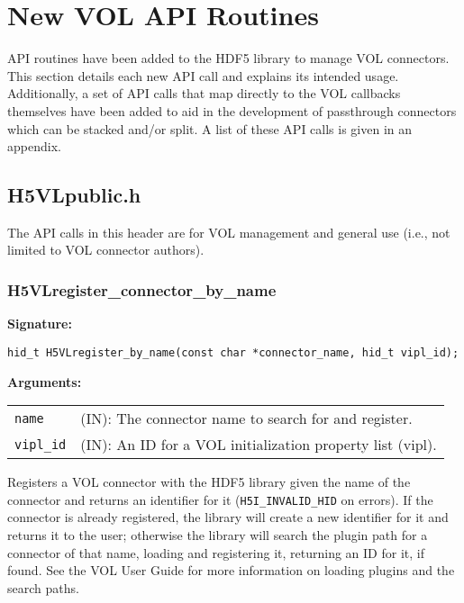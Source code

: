 \section{New VOL API Routines}
\label{sec:api}
API routines have been added to the HDF5 library to manage VOL connectors. This section details each new API call and explains its intended usage. Additionally, a set of API calls that map directly to the VOL callbacks themselves have been added to aid in the development of passthrough connectors which can be stacked and/or split. A list of these API calls is given in an appendix.

\bigskip

\subsection{H5VLpublic.h}

The API calls in this header are for VOL management and general use (i.e., not
limited to VOL connector authors).

\subsubsection{H5VLregister\_connector\_by\_name}
\begin{mdframed}[style=bgbox]
\textbf{Signature:}
\begin{lstlisting}
hid_t H5VLregister_by_name(const char *connector_name, hid_t vipl_id);
\end{lstlisting}
\textbf{Arguments:}\\
\begin{tabular}{l p{13.5cm}}
  {\tt name} & (IN): The connector name to search for and register.\\
  {\tt vipl\_id} & (IN): An ID for a VOL initialization property list (vipl).\\
\end{tabular}
\end{mdframed}
Registers a VOL connector with the HDF5 library given the name of the connector and returns an identifier for it (\texttt{H5I\_INVALID\_HID} on errors). If the connector is already registered, the library will create a new identifier for it and returns it to the user; otherwise the library will search the plugin path for a connector of that name, loading and registering it, returning an ID for it, if found. See the VOL User Guide for more information on loading plugins and the search paths.
\bigskip



